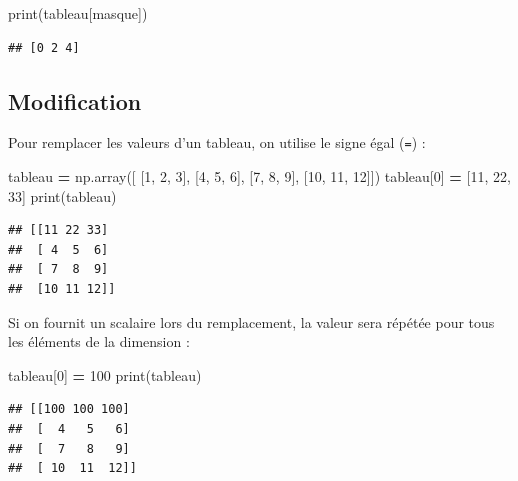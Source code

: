 \documentclass[12pt,]{book}
\newenvironment{Shaded}{\begin{snugshade}}{\end{snugshade}}
\newcommand{\DecValTok}[1]{\textcolor[rgb]{0.00,0.00,0.81}{#1}}
\newcommand{\OperatorTok}[1]{\textcolor[rgb]{0.81,0.36,0.00}{\textbf{#1}}}
\newcommand{\BuiltInTok}[1]{#1}
\newcommand{\NormalTok}[1]{#1}
\numberwithin{equation}{section}
\numberwithin{countremarque}{section}
\begin{document}
\begin{Shaded}
\begin{Highlighting}[]
\BuiltInTok{print}\NormalTok{(tableau[masque])}
\end{Highlighting}
\end{Shaded}

\begin{lstlisting}
## [0 2 4]
\end{lstlisting}

\subsection{Modification}\label{modification-3}

Pour remplacer les valeurs d'un tableau, on utilise le signe égal
(\texttt{=}) :

\begin{Shaded}
\begin{Highlighting}[]
\NormalTok{tableau }\OperatorTok{=}\NormalTok{ np.array([ [}\DecValTok{1}\NormalTok{, }\DecValTok{2}\NormalTok{, }\DecValTok{3}\NormalTok{], [}\DecValTok{4}\NormalTok{, }\DecValTok{5}\NormalTok{, }\DecValTok{6}\NormalTok{], [}\DecValTok{7}\NormalTok{, }\DecValTok{8}\NormalTok{, }\DecValTok{9}\NormalTok{], [}\DecValTok{10}\NormalTok{, }\DecValTok{11}\NormalTok{, }\DecValTok{12}\NormalTok{]])}
\NormalTok{tableau[}\DecValTok{0}\NormalTok{] }\OperatorTok{=}\NormalTok{ [}\DecValTok{11}\NormalTok{, }\DecValTok{22}\NormalTok{, }\DecValTok{33}\NormalTok{]}
\BuiltInTok{print}\NormalTok{(tableau)}
\end{Highlighting}
\end{Shaded}

\begin{lstlisting}
## [[11 22 33]
##  [ 4  5  6]
##  [ 7  8  9]
##  [10 11 12]]
\end{lstlisting}

Si on fournit un scalaire lors du remplacement, la valeur sera répétée
pour tous les éléments de la dimension :

\begin{Shaded}
\begin{Highlighting}[]
\NormalTok{tableau[}\DecValTok{0}\NormalTok{] }\OperatorTok{=} \DecValTok{100}
\BuiltInTok{print}\NormalTok{(tableau)}
\end{Highlighting}
\end{Shaded}

\begin{lstlisting}
## [[100 100 100]
##  [  4   5   6]
##  [  7   8   9]
##  [ 10  11  12]]
\end{lstlisting}
\end{document}
